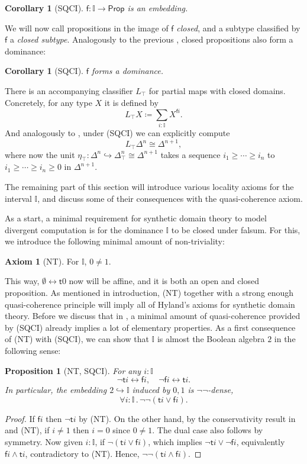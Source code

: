 \documentclass[12pt]{amsart}
\newtheorem{corollary}[theorem]{Corollary}
\newtheorem{proposition}[theorem]{Proposition}
\theoremstyle{definition}
\newtheorem*{axiom}{Axiom}
\newcommand{\mbb}[1]{\mathbb{#1}}
\newcommand{\I}{\mbb I}
\newcommand{\ms}[1]{\mathsf{#1}}
\newcommand{\hook}{\hookrightarrow}
\newcommand{\dneg}{\neg\neg}
\newcommand{\cprt}{_{\top}}
\newcommand{\fa}[2]{\forall #1\!\colon\!\!#2\mathpunct{.}}
\newcommand{\emp}{\emptyset}
\newcommand{\eq}{\leftrightarrow}
\newcommand{\pp}{\ms{Prop}}
\begin{document}
\begin{corollary}[SQCI]
  $\ms f \colon \I \to \pp$ is an embedding.
\end{corollary}

We will now call propositions in the image of $\ms f$ \emph{closed}, and a subtype classified by $\ms f$ a \emph{closed subtype}. Analogously to the previous , closed propositions also form a dominance:

\begin{corollary}[SQCI]\label{cor:dualisdominance}
  $\ms f$ forms a dominance.
\end{corollary}

There is an accompanying classifier $L\cprt$ for partial maps with closed domains. Concretely, for any type $X$ it is defined by
\[ L\cprt X \coloneq \sum_{i:\I} X^{\ms fi}. \]
And analogously to , under (SQCI) we can explicitly compute 
\[ L\cprt\Delta^n \cong \Delta^{n+1}, \]
where now the unit $\eta\cprt \colon \Delta^n \hook \Delta^n\cprt \cong \Delta^{n+1}$ takes a sequence $i_1 \ge \cdots \ge i_n$ to $i_1 \ge \cdots \ge i_n \ge 0$ in $\Delta^{n+1}$. 

The remaining part of this section will introduce various locality axioms for the interval $\I$, and discuss some of their consequences with the quasi-coherence axiom.

As a start, a minimal requirement for synthetic domain theory to model divergent computation is for the dominance $\I$ to be closed under falsum. For this, we introduce the following minimal amount of non-triviality:

\begin{axiom}[NT]\label{ax:nt}
  For $\I$, $0 \neq 1$.
\end{axiom}

This way, $\emp \eq \ms t0$ now will be affine, and it is both an open and closed proposition. As mentioned in introduction, (NT) together with a strong enough quasi-coherence principle will imply all of Hyland's axioms for synthetic domain theory. Before we discuss that in , a minimal amount of quasi-coherence provided by (SQCI) already implies a lot of elementary properties. As a first consequence of (NT) with (SQCI), we can show that $\I$ is almost the Boolean algebra $2$ in the following sense:

\begin{proposition}[NT, SQCI]\label{prop:filed}
  For any $i : \I$ 
  \[ \neg \ms ti \eq \ms fi, \quad \neg\ms fi \eq \ms ti. \]
  In particular, the embedding $2 \hook \I$ induced by $0,1$ is $\neg\neg$-dense,
  \[ \fa i\I \dneg(\ms ti \vee \ms fi). \]
\end{proposition}
\begin{proof}
  If $\ms fi$ then $\neg\ms ti$ by (NT). On the other hand, by the conservativity result in  and (NT), if $i \neq 1$ then $i = 0$ since $0 \neq 1$. The dual case also follows by symmetry. Now given $i :\I$, if $\neg(\ms ti \vee \ms fi)$, which implies $\neg\ms ti \vee \neg\ms fi$, equivalently $\ms fi \wedge \ms ti$, contradictory to (NT). Hence, $\neg\neg(\ms ti \wedge \ms fi)$.
\end{proof}
\end{document}
